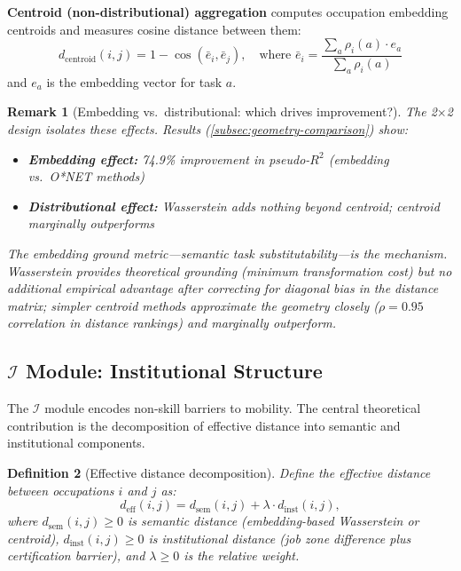 \documentclass[12pt]{article}
\newtheorem{definition}{Definition}[section]
\newtheorem{remark}[definition]{Remark}
\begin{document}
\textbf{Centroid (non-distributional) aggregation} computes occupation embedding centroids and measures cosine distance between them:
\[
d_{\mathrm{centroid}}(i, j) = 1 - \cos\left(\bar{e}_i, \bar{e}_j\right), \quad \text{where } \bar{e}_i = \frac{\sum_a \rho_i(a) \cdot e_a}{\sum_a \rho_i(a)}
\]
and $e_a$ is the embedding vector for task $a$.


\begin{remark}[Embedding vs.\ distributional: which drives improvement?]
\label{rem:embedding-vs-distributional}
The 2$\times$2 design isolates these effects. Results (\cref{subsec:geometry-comparison}) show:
\begin{itemize}
    \item \textbf{Embedding effect:} 74.9\% improvement in pseudo-$R^2$ (embedding vs.\ O*NET methods)
    \item \textbf{Distributional effect:} Wasserstein adds nothing beyond centroid; centroid marginally outperforms
\end{itemize}
The embedding ground metric---semantic task substitutability---is the mechanism. Wasserstein provides theoretical grounding (minimum transformation cost) but no additional empirical advantage after correcting for diagonal bias in the distance matrix; simpler centroid methods approximate the geometry closely ($\rho = 0.95$ correlation in distance rankings) and marginally outperform.
\end{remark}


\subsection{$\mathcal{I}$ Module: Institutional Structure}
\label{subsec:i-module}


The $\mathcal{I}$ module encodes non-skill barriers to mobility. The central theoretical contribution is the decomposition of effective distance into semantic and institutional components.


\begin{definition}[Effective distance decomposition]
\label{def:effective-distance}
Define the \emph{effective distance} between occupations $i$ and $j$ as:
\[
d_{\mathrm{eff}}(i,j) = d_{\mathrm{sem}}(i,j) + \lambda \cdot d_{\mathrm{inst}}(i,j),
\]
where $d_{\mathrm{sem}}(i,j) \geq 0$ is semantic distance (embedding-based Wasserstein or centroid), $d_{\mathrm{inst}}(i,j) \geq 0$ is institutional distance (job zone difference plus certification barrier), and $\lambda \geq 0$ is the relative weight.
\end{definition}
\end{document}
